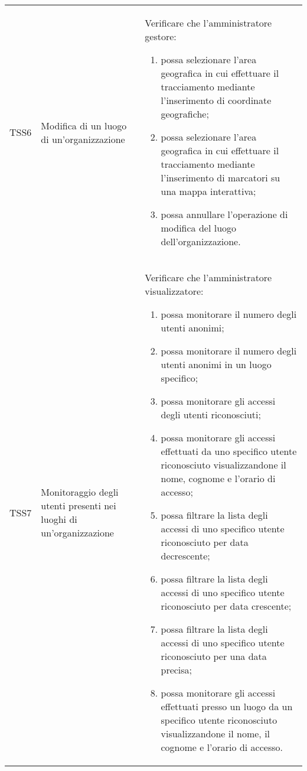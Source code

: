 {\begin{longtable}{ c | C{3cm} | C{11cm} }
TSS6 & Modifica di un luogo di un'organizzazione & 
Verificare che l'amministratore gestore:
\begin{enumerate}
    \item possa selezionare l'area geografica in cui effettuare il tracciamento mediante l'inserimento di coordinate geografiche;
    \item possa selezionare l'area geografica in cui effettuare il tracciamento mediante l'inserimento di marcatori su una mappa interattiva;
    \item possa annullare l'operazione di modifica del luogo dell'organizzazione.
\end{enumerate} \\

TSS7 & Monitoraggio degli utenti presenti nei luoghi di un'organizzazione &
Verificare che l'amministratore visualizzatore:
\begin{enumerate}
    \item possa monitorare il numero degli utenti anonimi;
    \item possa monitorare il numero degli utenti anonimi in un luogo specifico;
    \item possa monitorare gli accessi degli utenti riconosciuti;
    \item possa monitorare gli accessi effettuati da uno specifico utente riconosciuto visualizzandone il nome, cognome e l'orario di accesso;
    \item possa filtrare la lista degli accessi di uno specifico utente riconosciuto per data decrescente;
    \item possa filtrare la lista degli accessi di uno specifico utente riconosciuto per data crescente;
    \item possa filtrare la lista degli accessi di uno specifico utente riconosciuto per una data precisa;
    \item possa monitorare gli accessi effettuati presso un luogo da un specifico utente riconosciuto visualizzandone il nome, il cognome e l’orario di accesso.
\end{enumerate} \\


\end{longtable}}
